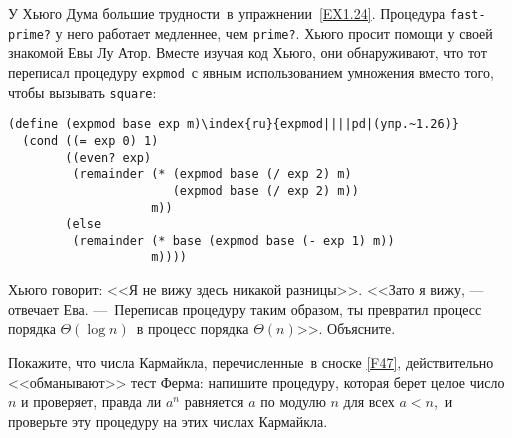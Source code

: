 \begin{exercise}{1.26}\label{EX1.26}%
У Хьюго Дума большие трудности~в упражнении~\ref{EX1.24}. Процедура {\tt fast-prime?} у
него работает медленнее, чем {\tt prime?}. Хьюго просит помощи у
своей знакомой Евы Лу Атор.  Вместе изучая код Хьюго, они обнаруживают,
что тот переписал процедуру {\tt expmod}~с явным
использованием умножения вместо того, чтобы вызывать
{\tt square}:

\begin{Verbatim}
(define (expmod base exp m)\index{ru}{expmod||||pd|(упр.~1.26)}
  (cond ((= exp 0) 1)
        ((even? exp)
         (remainder (* (expmod base (/ exp 2) m)
                       (expmod base (/ exp 2) m))
                    m))
        (else
         (remainder (* base (expmod base (- exp 1) m))
                    m))))
\end{Verbatim}
Хьюго говорит: <<Я не вижу здесь никакой разницы>>. <<Зато я вижу, --- 
отвечает Ева. ---~Переписав процедуру таким образом, ты превратил
процесс порядка $\Theta (\log n)$~в процесс порядка
$\Theta (n)$>>.  Объясните.
\end{exercise}
\begin{exercise}{1.27}\label{EX1.27}%
Покажите, что числа Кармайкла, перечисленные~в сноске
\ref{F47}, действительно <<обманывают>> тест Ферма:
напишите процедуру, которая берет целое число $n$ и
проверяет, правда ли $a^n$ равняется $a$ по
модулю $n$ для всех $a < n$,~и проверьте эту 
процедуру на этих числах Кармайкла.
\end{exercise}
